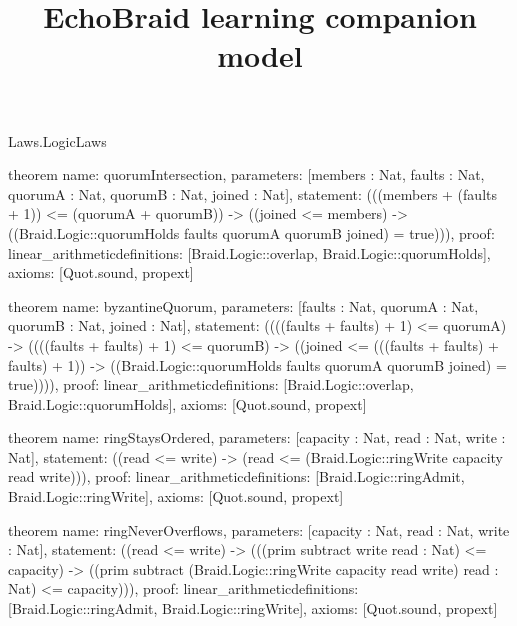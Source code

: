 \begin{lexlean}{Laws.LogicLaws}
\title{EchoBraid learning companion model}
\begin{semanticmodule}
theorem{
  name: quorumIntersection,
  parameters: [members : Nat, faults : Nat, quorumA : Nat, quorumB : Nat, joined : Nat],
  statement: (((members + (faults + 1)) <= (quorumA + quorumB)) -> ((joined <= members) -> ((Braid.Logic::quorumHolds faults quorumA quorumB joined) = true))),
  proof: linear_arithmetic{definitions: [Braid.Logic::overlap, Braid.Logic::quorumHolds]},
  axioms: [Quot.sound, propext]
}

theorem{
  name: byzantineQuorum,
  parameters: [faults : Nat, quorumA : Nat, quorumB : Nat, joined : Nat],
  statement: ((((faults + faults) + 1) <= quorumA) -> ((((faults + faults) + 1) <= quorumB) -> ((joined <= (((faults + faults) + faults) + 1)) -> ((Braid.Logic::quorumHolds faults quorumA quorumB joined) = true)))),
  proof: linear_arithmetic{definitions: [Braid.Logic::overlap, Braid.Logic::quorumHolds]},
  axioms: [Quot.sound, propext]
}

theorem{
  name: ringStaysOrdered,
  parameters: [capacity : Nat, read : Nat, write : Nat],
  statement: ((read <= write) -> (read <= (Braid.Logic::ringWrite capacity read write))),
  proof: linear_arithmetic{definitions: [Braid.Logic::ringAdmit, Braid.Logic::ringWrite]},
  axioms: [Quot.sound, propext]
}

theorem{
  name: ringNeverOverflows,
  parameters: [capacity : Nat, read : Nat, write : Nat],
  statement: ((read <= write) -> (((prim subtract write read : Nat) <= capacity) -> ((prim subtract (Braid.Logic::ringWrite capacity read write) read : Nat) <= capacity))),
  proof: linear_arithmetic{definitions: [Braid.Logic::ringAdmit, Braid.Logic::ringWrite]},
  axioms: [Quot.sound, propext]
}
\end{semanticmodule}
\end{lexlean}
